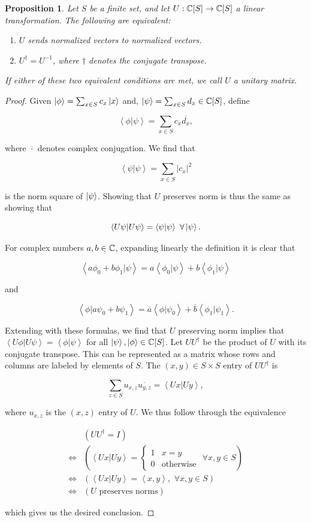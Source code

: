 \documentclass{article}
\newtheorem{proposition}{Proposition}[section]
\theoremstyle{definition}
\numberwithin{figure}{section}
\begin{document}
\begin{proposition}\label{unitary equivilance} Let $S$ be a finite set, and let $U: \mathbb{C}[S]\to \mathbb{C}[S]$ a linear transformation. The following are equivalent:

\begin{enumerate}
\item $U$ sends normalized vectors to normalized vectors.
\item $U^{\dagger}=U^{-1}$, where $\dagger$ denotes the conjugate transpose.
\end{enumerate}

If either of these two equivalent conditions are met, we call $U$ a unitary matrix.
\end{proposition}
\begin{proof} Given $\left|\phi\right>=\sum_{x\in S}c_x\left|x\right>$ and, $\left|\psi\right>=\sum_{x\in S}d_x\in \mathbb{C}[S]$, define

$$\left<\phi|\psi\right>=\sum_{x\in S}c_x\overline{d_x},$$

where $\overline{\cdot}$ denotes complex conjugation. We find that

$$\left<\psi|\psi\right>=\sum_{x\in S}|c_x|^2$$

is the norm square of $\left|\psi\right>$. Showing that $U$ preserves norm is thus the same as showing that

$$\left<U\psi|U\psi\right>=\left<\psi|\psi\right>\,\, \forall \left|\psi\right>.$$

For complex numbers $a,b\in \mathbb{C}$, expanding linearly the definition it is clear that

$$\left<a\phi_0+b\phi_1|\psi\right>=a\left<\phi_0|\psi\right>+b\left<\phi_1|\psi\right>$$

and

$$\left<\phi|a\psi_0+b\psi_1\right>=\overline{a}\left<\phi|\psi_0\right>+\overline{b}\left<\phi_1|\psi_1\right>.$$

Extending with these formulas, we find that $U$ preserving norm implies that $\left<U\phi|U\psi\right>=\left<\phi|\psi\right>$ for all $\left|\psi\right>,\left|\phi\right>\in \mathbb{C}[S]$. Let $U U^{\dagger}$ be the product of $U$ with its conjugate transpose. This can be represented as a matrix whose rows and columns are labeled by elements of $S$. The $(x,y)\in S\times S$ entry of $U U^{\dagger}$ is

$$\sum_{z\in S}u_{x,z}\overline{u_{y,z}}=\left<U x| U y\right>,$$

where $u_{x,z}$ is the $(x,z)$ entry of $U$. We thus follow through the equivalence

\begin{align*}
&\left(UU^{\dagger}=I\right)\\
\iff&\left(\left<Ux|Uy\right>=
\begin{cases}
1 & x=y\\
0 & \text{otherwise}
\end{cases}\,\, \forall x,y\in S\right)\\
\iff & \left(\left<Ux|Uy\right>=\left<x,y\right>,\,\, \forall x,y\in S\right)\\
\iff & \left(U\text{ preserves norms}\right)
\end{align*}

which gives us the desired conclusion.
\end{proof}
\end{document}
